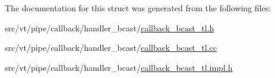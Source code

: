 The documentation for this struct was generated from the following files\+:\begin{DoxyCompactItemize}
\item 
src/vt/pipe/callback/handler\+\_\+bcast/\hyperlink{callback__bcast__tl_8h}{callback\+\_\+bcast\+\_\+tl.\+h}\item 
src/vt/pipe/callback/handler\+\_\+bcast/\hyperlink{callback__bcast__tl_8cc}{callback\+\_\+bcast\+\_\+tl.\+cc}\item 
src/vt/pipe/callback/handler\+\_\+bcast/\hyperlink{callback__bcast__tl_8impl_8h}{callback\+\_\+bcast\+\_\+tl.\+impl.\+h}\end{DoxyCompactItemize}
